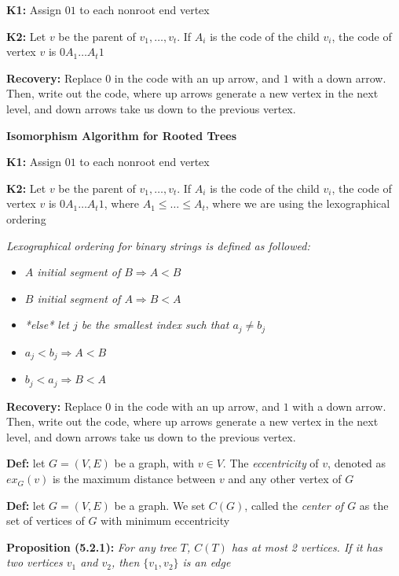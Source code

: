 \documentclass[12pt]{article}
\begin{document}
\textbf{K1: }Assign $01$ to each nonroot end vertex

\textbf{K2: }Let $v$ be the parent of $v_1, \dots, v_t$. If $A_i$ is the code of the child $v_i$, the code of vertex $v$ is $0A_1 \dots A_t1$

\textbf{Recovery: }Replace $0$ in the code with an up arrow, and $1$ with a down arrow. Then, write out the code, where up arrows generate a new vertex in the next level, and down arrows take us down to the previous vertex. 

\textbf{Isomorphism Algorithm for Rooted Trees}

\textbf{K1: }Assign $01$ to each nonroot end vertex

\textbf{K2: }Let $v$ be the parent of $v_1, \dots, v_t$. If $A_i$ is the code of the child $v_i$, the code of vertex $v$ is $0A_1 \dots A_t1$, where $A_1 \leq \dots \leq A_t$, where we are using the lexographical ordering

\emph{Lexographical ordering for binary strings is defined as followed: }
\begin{itemize}
    \item \emph{$A$ initial segment of $B \Rightarrow A < B$}
    \item \emph{$B$ initial segment of $A \Rightarrow B < A$}
    \item \emph{*else* let $j$ be the smallest index such that $a_j \neq b_j$}
    \item \emph{$a_j < b_j \Rightarrow A < B$}
    \item \emph{$b_j < a_j \Rightarrow B < A$}
\end{itemize}

\textbf{Recovery: }Replace $0$ in the code with an up arrow, and $1$ with a down arrow. Then, write out the code, where up arrows generate a new vertex in the next level, and down arrows take us down to the previous vertex. 

\textbf{Def: }let $G = (V, E)$ be a graph, with $v \in V$. The \emph{eccentricity} of $v$, denoted as $ex_G(v)$ is the maximum distance between $v$ and any other vertex of $G$

\textbf{Def: }let $G = (V, E)$ be a graph. We set $C(G)$, called the \emph{center of $G$} as the set of vertices of $G$ with minimum eccentricity

\textbf{Proposition (5.2.1): }\emph{For any tree $T$, $C(T)$ has at most 2 vertices. If it has two vertices $v_1$ and $v_2$, then $\{ v_1, v_2 \}$ is an edge}\\
\end{document}
